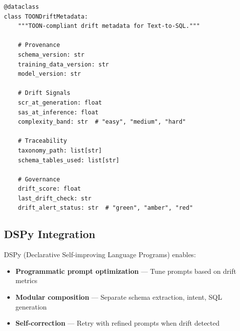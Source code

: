 \begin{lstlisting}[language=jsonx,caption={TOON drift metadata structure}]
@dataclass
class TOONDriftMetadata:
    """TOON-compliant drift metadata for Text-to-SQL."""
    
    # Provenance
    schema_version: str
    training_data_version: str
    model_version: str
    
    # Drift Signals
    scr_at_generation: float
    sas_at_inference: float
    complexity_band: str  # "easy", "medium", "hard"
    
    # Traceability
    taxonomy_path: list[str]
    schema_tables_used: list[str]
    
    # Governance
    drift_score: float
    last_drift_check: str
    drift_alert_status: str  # "green", "amber", "red"
\end{lstlisting}

\subsection{DSPy Integration}

DSPy (Declarative Self-improving Language Programs) enables:

\begin{itemize}
  \item \textbf{Programmatic prompt optimization} --- Tune prompts based on drift metrics
  \item \textbf{Modular composition} --- Separate schema extraction, intent, SQL generation
  \item \textbf{Self-correction} --- Retry with refined prompts when drift detected
\end{itemize}

